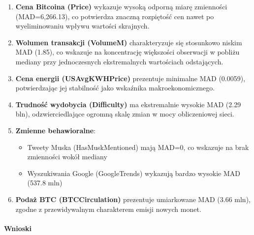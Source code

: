 \documentclass[
  11pt,
]{article}
\providecommand{\tightlist}{%
  \setlength{\itemsep}{0pt}\setlength{\parskip}{0pt}}
\begin{document}
\begin{enumerate}
\def\labelenumi{\arabic{enumi}.}
\item
  \textbf{Cena Bitcoina (Price)} wykazuje wysoką odporną miarę
  zmienności (MAD=6,266.13), co potwierdza znaczną rozpiętość cen nawet
  po wyeliminowaniu wpływu wartości skrajnych.
\item
  \textbf{Wolumen transakcji (VolumeM)} charakteryzuje się stosunkowo
  niskim MAD (1.85), co wskazuje na koncentrację większości obserwacji w
  pobliżu mediany przy jednoczesnych ekstremalnych wartościach
  odstających.
\item
  \textbf{Cena energii (USAvgKWHPrice)} prezentuje minimalne MAD
  (0.0059), potwierdzając jej stabilność jako wskaźnika
  makroekonomicznego.
\item
  \textbf{Trudność wydobycia (Difficulty)} ma ekstremalnie wysokie MAD
  (2.29 bln), odzwierciedlające ogromną skalę zmian w mocy obliczeniowej
  sieci.
\item
  \textbf{Zmienne behawioralne}:

  \begin{itemize}
  \tightlist
  \item
    Tweety Muska (HasMuskMentioned) mają MAD=0, co wskazuje na brak
    zmienności wokół mediany
  \item
    Wyszukiwania Google (GoogleTrends) wykazują bardzo wysokie MAD
    (537.8 mln)
  \end{itemize}
\item
  \textbf{Podaż BTC (BTCCirculation)} prezentuje umiarkowane MAD (3.66
  mln), zgodne z przewidywalnym charakterem emisji nowych monet.
\end{enumerate}

\paragraph{Wnioski}\label{wnioski-7}
\end{document}
